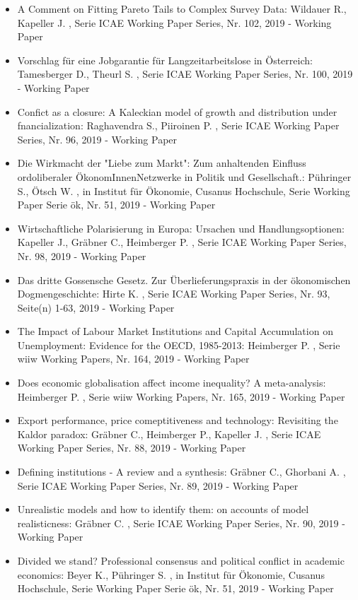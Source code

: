 \begin{itemize}
\item A Comment on Fitting Pareto Tails to Complex Survey Data: Wildauer R., Kapeller J. , Serie ICAE Working Paper Series, Nr. 102, 2019 - Working Paper
\item Vorschlag für eine Jobgarantie für Langzeitarbeitslose in Österreich: Tamesberger D., Theurl S. , Serie ICAE Working Paper Series, Nr. 100, 2019 - Working Paper
\item Confict as a closure: A Kaleckian model of growth and distribution under fnancialization: Raghavendra S., Piiroinen P. , Serie ICAE Working Paper Series, Nr. 96, 2019 - Working Paper
\item Die Wirkmacht der "Liebe zum Markt": Zum anhaltenden Einfluss ordoliberaler ÖkonomInnenNetzwerke in Politik und Gesellschaft.: Pühringer S., Ötsch W. , in Institut für Ökonomie, Cusanus Hochschule, Serie Working Paper Serie ök, Nr. 51, 2019 - Working Paper
\item Wirtschaftliche Polarisierung in Europa: Ursachen und Handlungsoptionen: Kapeller J., Gräbner C., Heimberger P. , Serie ICAE Working Paper Series, Nr. 98, 2019 - Working Paper
\item Das dritte Gossensche Gesetz. Zur Überlieferungspraxis in der ökonomischen Dogmengeschichte: Hirte K. , Serie ICAE Working Paper Series, Nr. 93, Seite(n) 1-63, 2019 - Working Paper
\item The Impact of Labour Market Institutions and Capital Accumulation on Unemployment: Evidence for the OECD, 1985-2013: Heimberger P. , Serie wiiw Working Papers, Nr. 164, 2019 - Working Paper
\item Does economic globalisation affect income inequality? A meta-analysis: Heimberger P. , Serie wiiw Working Papers, Nr. 165, 2019 - Working Paper
\item Export performance, price comeptitiveness and technology: Revisiting the Kaldor paradox: Gräbner C., Heimberger P., Kapeller J. , Serie ICAE Working Paper Series, Nr. 88, 2019 - Working Paper
\item Defining institutions - A review and a synthesis: Gräbner C., Ghorbani A. , Serie ICAE Working Paper Series, Nr. 89, 2019 - Working Paper
\item Unrealistic models and how to identify them: on accounts of model realisticness: Gräbner C. , Serie ICAE Working Paper Series, Nr. 90, 2019 - Working Paper
\item Divided we stand? Professional consensus and political conflict in academic economics: Beyer K., Pühringer S. , in Institut für Ökonomie, Cusanus Hochschule, Serie Working Paper Serie ök, Nr. 51, 2019 - Working Paper

\end{itemize}
